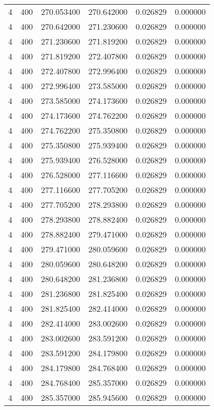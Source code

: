 \begin{longtable}{rrrrrr}
4 & 400 & 270.053400 & 270.642000 & 0.026829 & 0.000000 \\
4 & 400 & 270.642000 & 271.230600 & 0.026829 & 0.000000 \\
4 & 400 & 271.230600 & 271.819200 & 0.026829 & 0.000000 \\
4 & 400 & 271.819200 & 272.407800 & 0.026829 & 0.000000 \\
4 & 400 & 272.407800 & 272.996400 & 0.026829 & 0.000000 \\
4 & 400 & 272.996400 & 273.585000 & 0.026829 & 0.000000 \\
4 & 400 & 273.585000 & 274.173600 & 0.026829 & 0.000000 \\
4 & 400 & 274.173600 & 274.762200 & 0.026829 & 0.000000 \\
4 & 400 & 274.762200 & 275.350800 & 0.026829 & 0.000000 \\
4 & 400 & 275.350800 & 275.939400 & 0.026829 & 0.000000 \\
4 & 400 & 275.939400 & 276.528000 & 0.026829 & 0.000000 \\
4 & 400 & 276.528000 & 277.116600 & 0.026829 & 0.000000 \\
4 & 400 & 277.116600 & 277.705200 & 0.026829 & 0.000000 \\
4 & 400 & 277.705200 & 278.293800 & 0.026829 & 0.000000 \\
4 & 400 & 278.293800 & 278.882400 & 0.026829 & 0.000000 \\
4 & 400 & 278.882400 & 279.471000 & 0.026829 & 0.000000 \\
4 & 400 & 279.471000 & 280.059600 & 0.026829 & 0.000000 \\
4 & 400 & 280.059600 & 280.648200 & 0.026829 & 0.000000 \\
4 & 400 & 280.648200 & 281.236800 & 0.026829 & 0.000000 \\
4 & 400 & 281.236800 & 281.825400 & 0.026829 & 0.000000 \\
4 & 400 & 281.825400 & 282.414000 & 0.026829 & 0.000000 \\
4 & 400 & 282.414000 & 283.002600 & 0.026829 & 0.000000 \\
4 & 400 & 283.002600 & 283.591200 & 0.026829 & 0.000000 \\
4 & 400 & 283.591200 & 284.179800 & 0.026829 & 0.000000 \\
4 & 400 & 284.179800 & 284.768400 & 0.026829 & 0.000000 \\
4 & 400 & 284.768400 & 285.357000 & 0.026829 & 0.000000 \\
4 & 400 & 285.357000 & 285.945600 & 0.026829 & 0.000000 \\

\end{longtable}
